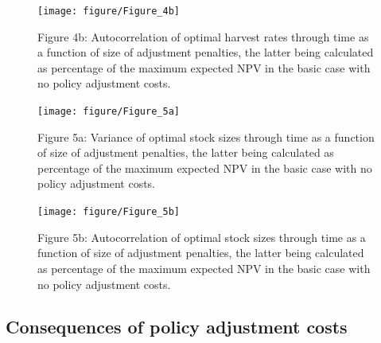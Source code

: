 \documentclass{article}\usepackage{graphicx, color}
\newenvironment{knitrout}{}{} %
\begin{document}
\begin{figure}
\begin{knitrout}
\color{fgcolor}
\texttt{[image: figure/Figure\_4b]} 

\end{knitrout}

\caption*{Figure 4b: Autocorrelation of optimal harvest rates through time as a function of size of adjustment penalties, the latter being calculated as percentage of the maximum expected NPV in the basic case with no policy adjustment costs. }
\end{figure}





\begin{figure}
\begin{knitrout}
\color{fgcolor}
\texttt{[image: figure/Figure\_5a]} 

\end{knitrout}


\caption*{Figure 5a: Variance of optimal stock sizes through time as a function of size of adjustment penalties, the latter being calculated as percentage of the maximum expected NPV in the basic case with no policy adjustment costs. }
\end{figure}

\begin{figure}
\begin{knitrout}
\color{fgcolor}
\texttt{[image: figure/Figure\_5b]} 

\end{knitrout}

\caption*{Figure 5b: Autocorrelation of optimal stock sizes through time as a function of size of adjustment penalties, the latter being calculated as percentage of the maximum expected NPV in the basic case with no policy adjustment costs. }
\end{figure}









\subsection*{Consequences of policy adjustment costs}
\end{document}
